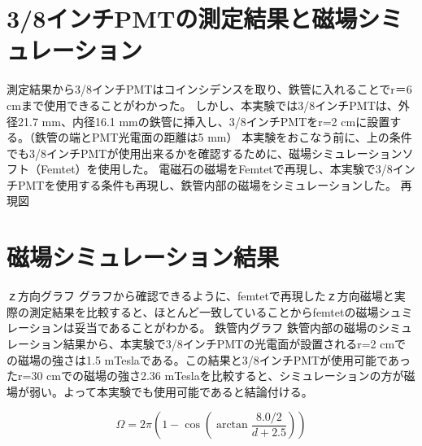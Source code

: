 \section{3/8インチPMTの測定結果と磁場シミュレーション}
測定結果から3/8インチPMTはコインシデンスを取り、鉄管に入れることでr＝6 cmまで使用できることがわかった。
しかし、本実験では3/8インチPMTは、外径21.7 mm、内径16.1 mmの鉄管に挿入し、3/8インチPMTをr=2 cmに設置する。（鉄管の端とPMT光電面の距離は5 mm）
本実験をおこなう前に、上の条件でも3/8インチPMTが使用出来るかを確認するために、磁場シミュレーションソフト（Femtet）を使用した。
電磁石の磁場をFemtetで再現し、本実験で3/8インチPMTを使用する条件も再現し、鉄管内部の磁場をシミュレーションした。
再現図



\section{磁場シミュレーション結果}
ｚ方向グラフ
グラフから確認できるように、femtetで再現したｚ方向磁場と実際の測定結果を比較すると、ほとんど一致していることからfemtetの磁場シュミレーションは妥当であることがわかる。
鉄管内グラフ
鉄管内部の磁場のシミュレーション結果から、本実験で3/8インチPMTの光電面が設置されるr=2 cmでの磁場の強さは1.5 mTeslaである。この結果と3/8インチPMTが使用可能であったr=30 cmでの磁場の強さ2.36 mTeslaを比較すると、シミュレーションの方が磁場が弱い。よって本実験でも使用可能であると結論付ける。












\begin{equation}
	\Omega = 2\pi \left( 1-\cos\left(\arctan\frac{8.0/2}{d+2.5}\right)\right)
\end{equation}
